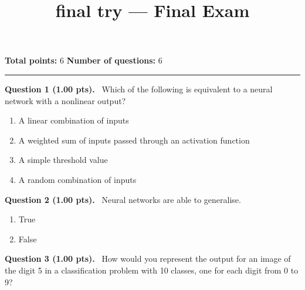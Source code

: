 \documentclass[12pt,a4paper]{article}
\title{final try — Final Exam}
\date{}
\begin{document}
\maketitle



\noindent
\textbf{Total points:} 6
\hfill
\textbf{Number of questions:} 6

\vspace{1em}
\hrule
\vspace{1.5em}


\noindent
\textbf{Question 1 (1.00 pts).}~
Which of the following is equivalent to a neural network with a nonlinear output?


\begin{enumerate}[label=\textbf{\Alph*.}]

  \item A linear combination of inputs

  \item A weighted sum of inputs passed through an activation function

  \item A simple threshold value

  \item A random combination of inputs

\end{enumerate}



\vspace{0.5em}


\noindent
\textbf{Question 2 (1.00 pts).}~
Neural networks are able to generalise.


\begin{enumerate}[label=\textbf{\Alph*.}]
  \item True
  \item False
\end{enumerate}



\vspace{0.5em}


\noindent
\textbf{Question 3 (1.00 pts).}~
How would you represent the output for an image of the digit 5 in a classification problem with 10 classes, one for each digit from 0 to 9?


\vspace{0.4cm}
\noindent\makebox[\linewidth]{\hrulefill}
\vspace{0.6cm}



\vspace{0.5em}
\end{document}
